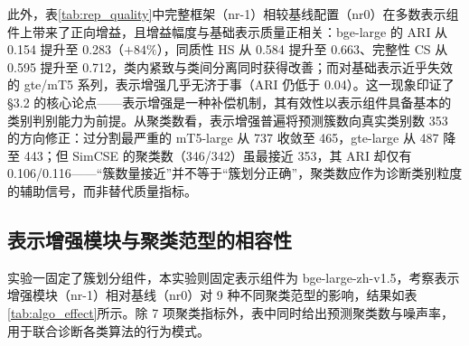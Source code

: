\documentclass[10.5pt,compsoc,UTF8]{CjC}
\theoremstyle{mystyle}
\begin{document}
此外，表\ref{tab:rep_quality}中完整框架（nr-1）相较基线配置（nr0）在多数表示组件上带来了正向增益，且增益幅度与基础表示质量正相关：bge-large 的 ARI 从 0.154 提升至 0.283（$+84\%$），同质性 HS 从 0.584 提升至 0.663、完整性 CS 从 0.595 提升至 0.712，类内紧致与类间分离同时获得改善；而对基础表示近乎失效的 gte/mT5 系列，表示增强几乎无济于事（ARI 仍低于 0.04）。这一现象印证了\S 3.2 的核心论点——表示增强是一种补偿机制，其有效性以表示组件具备基本的类别判别能力为前提。从聚类数看，表示增强普遍将预测簇数向真实类别数 353 的方向修正：过分割最严重的 mT5-large 从 737 收敛至 465，gte-large 从 487 降至 443；但 SimCSE 的聚类数（346/342）虽最接近 353，其 ARI 却仅有 0.106/0.116——``簇数量接近''并不等于``簇划分正确''，聚类数应作为诊断类别粒度的辅助信号，而非替代质量指标。

{\heiti \subsection{表示增强模块与聚类范型的相容性}}

实验一固定了簇划分组件，本实验则固定表示组件为 bge-large-zh-v1.5，考察表示增强模块（nr-1）相对基线（nr0）对 9 种不同聚类范型的影响，结果如表\ref{tab:algo_effect}所示。除 7 项聚类指标外，表中同时给出预测聚类数与噪声率，用于联合诊断各类算法的行为模式。
\end{document}
